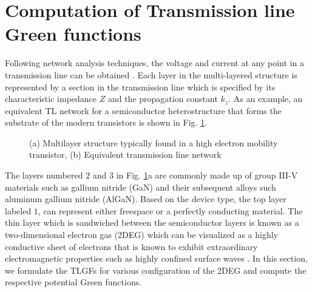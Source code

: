 \documentclass[12pt]{article}
\begin{document}
\section{Computation of Transmission line Green functions}
%
Following network analysis techniques, the voltage and current at any point in a transmission line can be obtained \cite{Felsen1994}. Each layer in the multi-layered structure is represented by a section in the transmission line which is specified by its characteristic impedance $Z$ and the propagation constant $k_z$. As an example, an equivalent TL network for a semiconductor heterostructure that forms the substrate of the modern transistors is shown in Fig. \ref{fig:TL_equivalent}.
%
\begin{figure}[t!]
  \centering
  \def\svgwidth{\linewidth}
  
  \caption{(a) Multilayer structure typically found in a high electron mobility transistor, (b) Equivalent transmission line network}
  \label{fig:TL_equivalent}
\end{figure}
%
The layers numbered $2$ and $3$ in Fig. \ref{fig:TL_equivalent}a are commonly made up of group III-V materials such as gallium nitride (GaN) and their subsequent alloys such aluminum gallium nitride (AlGaN). Based on the device type, the top layer labeled $1$, can represent either freespace or a perfectly conducting material. The thin layer which is sandwiched between the semiconductor layers is known as a two-dimensional electron gas (2DEG) which can be visualized as a highly conductive sheet of electrons that is known to exhibit extraordinary electromagnetic properties such as highly confined surface waves \cite{Stern1967,Allen1977}. In this section, we formulate the TLGFs for various configuration of the 2DEG and compute the respective potential Green functions.
\end{document}
